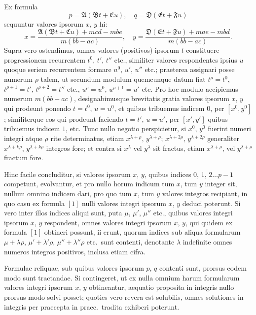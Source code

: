 \documentclass[12pt,a4paper]{article}
\theoremstyle{plain}
\theoremstyle{definition}
\theoremstyle{remark}
\begin{document}
Ex formula
\[
p=\mathfrak{A}(\mathfrak{B}t+\mathfrak{C}u),\quad q=\mathfrak{D}(\mathfrak{E}t+\mathfrak{F}u) \tag{1}
\]
sequuntur valores ipsorum $x$, $y$ hi:
\[
x=\frac{\mathfrak{A}(\mathfrak{B}t+\mathfrak{C}u)+mcd-mbe}{m(bb-ac)},\quad y=\frac{\mathfrak{D}(\mathfrak{E}t+\mathfrak{F}u)+mae-mbd}{m(bb-ac)}.
\]
Supra vero ostendimus, omnes valores (positivos) ipsorum $t$ constituere progressionem recurrentem $t^0$, $t'$, $t''$ etc., similiter valores respondentes ipsius $u$ quoque seriem recurrentem formare $u^0$, $u'$, $u''$ etc.; praeterea assignari posse numerum $\rho$ talem, ut secundum modulum quemcunque datum fiat $t^\rho=t^0$, $t^{\rho+1}=t'$, $t^{\rho+2}=t''$ etc., $u^\rho=u^0$, $u^{\rho+1}=u'$ etc. Pro hoc modulo accipiemus numerum $m(bb-ac)$, designabimusque brevitatis gratia valores ipsorum $x$, $y$ qui prodeunt ponendo $t=t^0$, $u=u^0$, et quibus tribuemus indicem $0$, per $[x^0,y^0]$; similiterque eos qui prodeunt faciendo $t=t'$, $u=u'$, per $[x',y']$ quibus tribuemus indicem $1$, etc. Tunc nullo negotio perspicietur, si $x^0$, $y^0$ fuerint numeri integri atque $\rho$ rite determinatus, etiam $x^{\lambda+\rho}$, $y^{\lambda+\rho}$; $x^{\lambda+2\rho}$, $y^{\lambda+2\rho}$ generaliter $x^{\lambda+k\rho}$, $y^{\lambda+k\rho}$ integros fore; et contra si $x^\lambda$ vel $y^\lambda$ sit fractus, etiam $x^{\lambda+\rho}$, vel $y^{\lambda+\rho}$ fractum fore.

Hinc facile concluditur, si valores ipsorum $x$, $y$, quibus indices $0$, $1$, $2\ldots p-1$ competunt, evolvantur, et pro nullo horum indicum tum $x$, tum $y$ integer sit, nullum omnino indicem dari, pro quo tum $x$, tum $y$ valores integros recipiant, in quo casu ex formula $[1]$ nulli valores integri ipsorum $x$, $y$ deduci poterunt. Si vero inter illos indices aliqui sunt, puta $\mu$, $\mu'$, $\mu''$ etc., quibus valores integri ipsorum $x$, $y$ respondent, omnes valores integri ipsorum $x$, $y$, qui quidem ex formula $[1]$ obtineri possunt, ii erunt, quorum indices sub aliqua formularum $\mu+\lambda\rho$, $\mu'+\lambda'\rho$, $\mu''+\lambda''\rho$ etc.\ sunt contenti, denotante $\lambda$ indefinite omnes numeros integros positivos, inclusa etiam cifra.

Formulae reliquae, sub quibus valores ipsorum $p$, $q$ contenti sunt, prorsus eodem modo sunt tractandae. Si contingeret, ut ex nulla omnium harum formularum valores integri ipsorum $x$, $y$ obtineantur, aequatio proposita in integris nullo prorsus modo solvi posset; quoties vero revera est solubilis, omnes solutiones in integris per praecepta in praec.\ tradita exhiberi poterunt.
\end{document}
